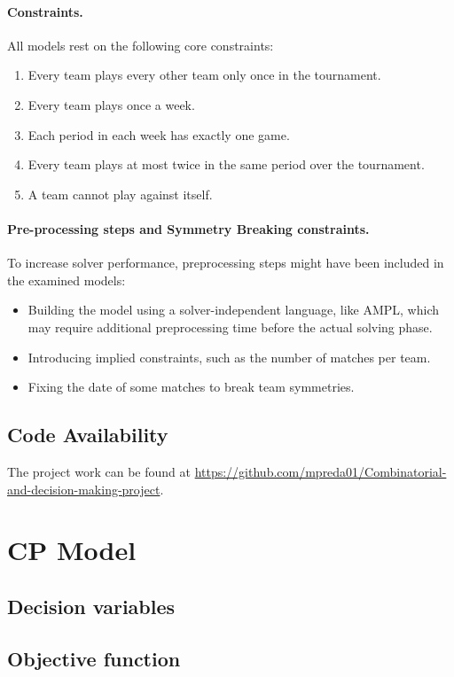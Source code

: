 \documentclass{article}
\begin{document}
\paragraph{Constraints.}
All models rest on the following core constraints:
\begin{enumerate}
    \item Every team plays every other team only once in the tournament.
    \item Every team plays once a week.
    \item Each period in each week has exactly one game.
    \item Every team plays at most twice in the same period over the tournament.
    \item A team cannot play against itself.
\end{enumerate}

\paragraph{Pre-processing steps and Symmetry Breaking constraints.}
To increase solver performance, preprocessing steps might have been included in the examined models:
\begin{itemize}
    \item Building the model using a solver-independent language, like AMPL, which may require additional preprocessing time before the actual solving phase.
    \item Introducing implied constraints, such as the number of matches per team.
    \item Fixing the date of some matches to break team symmetries.
\end{itemize}

\subsection{Code Availability}
The project work can be found at \url{https://github.com/mpreda01/Combinatorial-and-decision-making-project}.


\section{CP Model}

\subsection{Decision variables}

\subsection{Objective function}
\end{document}
